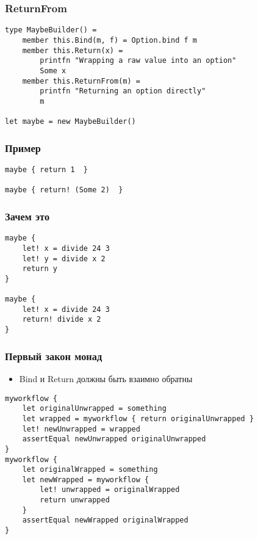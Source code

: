 \documentclass[xetex,mathserif,serif]{beamer}
\begin{document}
    \begin{frame}[fragile]
        \frametitle{ReturnFrom}
        \begin{verbatim}
type MaybeBuilder() =
    member this.Bind(m, f) = Option.bind f m
    member this.Return(x) = 
        printfn "Wrapping a raw value into an option"
        Some x
    member this.ReturnFrom(m) = 
        printfn "Returning an option directly"
        m

let maybe = new MaybeBuilder()
        \end{verbatim}
    \end{frame}

    \begin{frame}[fragile]
        \frametitle{Пример}
        \begin{verbatim}
maybe { return 1  }

maybe { return! (Some 2)  }
        \end{verbatim}
    \end{frame}

    \begin{frame}[fragile]
        \frametitle{Зачем это}
        \begin{verbatim}
maybe {
    let! x = divide 24 3
    let! y = divide x 2
    return y 
}

maybe {
    let! x = divide 24 3
    return! divide x 2  
}
        \end{verbatim}
    \end{frame}

    \begin{frame}[fragile]
        \frametitle{Первый закон монад}
        \begin{itemize}
            \item Bind и Return должны быть взаимно обратны
        \end{itemize}
        \begin{footnotesize}
            \begin{verbatim}
myworkflow {
    let originalUnwrapped = something
    let wrapped = myworkflow { return originalUnwrapped }
    let! newUnwrapped = wrapped
    assertEqual newUnwrapped originalUnwrapped 
}
myworkflow {
    let originalWrapped = something
    let newWrapped = myworkflow { 
        let! unwrapped = originalWrapped
        return unwrapped
    }
    assertEqual newWrapped originalWrapped
}
            \end{verbatim}
        \end{footnotesize}
    \end{frame}
\end{document}
